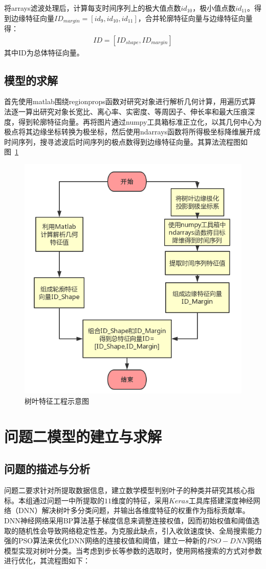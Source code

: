 \documentclass{whutmod}
\begin{document}
		将arrays滤波处理后，计算每支时间序列上的极大值点数$id_{10}$，极小值点数$id_{11}$。得到边缘特征向量$ID_{margin}=[id_{9},id_{10},id_{11}]$，合并轮廓特征向量与边缘特征向量得：
		\begin{gather}
		ID=[ID_{shape},ID_{margin}]
		\end{gather}
	     其中ID为总体特征向量。
	      \subsection{模型的求解}
	      首先使用matlab围绕regionprops函数对研究对象进行解析几何计算，用遍历式算法逐一算出研究对象长宽比、离心率、实密度、等周因子、伸长率和最大压痕深度，得到轮廓特征向量。再将图片通过numpy工具箱标准正立化，以其几何中心为极点将其边缘坐标转换为极坐标，然后使用ndarrays函数将所得极坐标降维展开成时间序列，搜寻滤波后时间序列的极点数得到边缘特征向量。其算法流程图如图~\ref{88}~
	      
	      \begin{figure}[H]
	      	\centering
	      	\includegraphics[width=.8\textwidth]{figures/lct.png}
	      	\caption{树叶特征工程示意图}\label{88}
	      \end{figure}
	      	
	
	
	
	
	\section{问题二模型的建立与求解}
	\subsection{问题的描述与分析}
	问题二要求针对所提取数据信息，建立数学模型判别叶子的种类并研究其核心指标。本组通过问题一中所提取的$11$维度的特征，采用$Keras$工具库搭建深度神经网络（DNN）解决树叶多分类问题，并输出各维度特征的权重作为指标贡献率。DNN神经网络采用BP算法基于梯度信息来调整连接权值，因而初始权值和阈值选取的随机性会导致网络稳定性差。为克服此缺点，引入收敛速度快、全局搜索能力强的PSO算法来优化DNN网络的连接权值和阈值，建立一种新的$PSO-DNN$网络模型实现对树叶分类。当考虑到步长等参数的选取时，使用网格搜索的方式对参数进行优化，其流程图如下：
		
\end{document}
